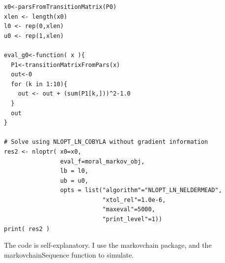 \documentclass{amsart}
\begin{document}
\begin{verbatim}
x0<-parsFromTransitionMatrix(P0)
xlen <- length(x0)
l0 <- rep(0,xlen)
u0 <- rep(1,xlen)

eval_g0<-function( x ){
  P1<-transitionMatrixFromPars(x)
  out<-0
  for (k in 1:10){
    out <- out + (sum(P1[k,]))^2-1.0
  }
  out
}

# Solve using NLOPT_LN_COBYLA without gradient information
res2 <- nloptr( x0=x0,
                eval_f=moral_markov_obj,
                lb = l0,
                ub = u0,
                opts = list("algorithm"="NLOPT_LN_NELDERMEAD",
                            "xtol_rel"=1.0e-6,
                            "maxeval"=5000,
                            "print_level"=1))
print( res2 )
\end{verbatim}

The code is self-explanatory.  I use the markovchain package, and the markovchainSequence function to simulate.
\end{document}
